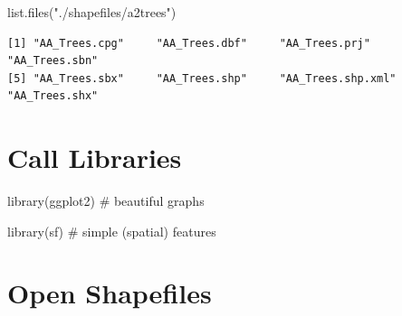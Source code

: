 \documentclass[
  letterpaper,
  DIV=11,
  numbers=noendperiod,
  oneside]{scrreprt}
\newenvironment{Shaded}{\begin{snugshade}}{\end{snugshade}}
\newcommand{\CommentTok}[1]{\textcolor[rgb]{0.37,0.37,0.37}{#1}}
\newcommand{\FunctionTok}[1]{\textcolor[rgb]{0.28,0.35,0.67}{#1}}
\newcommand{\NormalTok}[1]{\textcolor[rgb]{0.00,0.23,0.31}{#1}}
\newcommand{\StringTok}[1]{\textcolor[rgb]{0.13,0.47,0.30}{#1}}
\begin{document}
\begin{Shaded}
\begin{Highlighting}[]
\FunctionTok{list.files}\NormalTok{(}\StringTok{"./shapefiles/a2trees"}\NormalTok{)}
\end{Highlighting}
\end{Shaded}

\begin{verbatim}
[1] "AA_Trees.cpg"     "AA_Trees.dbf"     "AA_Trees.prj"     "AA_Trees.sbn"    
[5] "AA_Trees.sbx"     "AA_Trees.shp"     "AA_Trees.shp.xml" "AA_Trees.shx"    
\end{verbatim}

\section{Call Libraries}\label{call-libraries-1}

\begin{Shaded}
\begin{Highlighting}[]
\FunctionTok{library}\NormalTok{(ggplot2) }\CommentTok{\# beautiful graphs}

\FunctionTok{library}\NormalTok{(sf) }\CommentTok{\# simple (spatial) features}
\end{Highlighting}
\end{Shaded}

\section{Open Shapefiles}\label{open-shapefiles}
\end{document}
